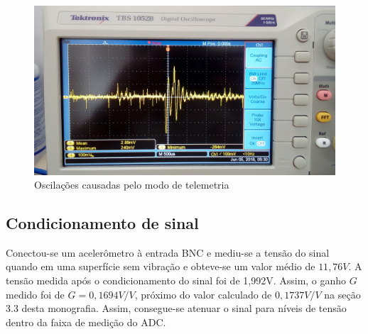 \documentclass[
	12pt,				%
	openright,			%
	twoside,			%
	a4paper,			%
	english,			%
	french,				%
	spanish,			%
	brazil,				%
	]{abntex2}
\begin{document}
			\begin{figure}[!ht]
				\centering
				\includegraphics[width = \linewidth]{../Fotos/osc33.jpg}
				\caption{Oscilações causadas pelo modo de telemetria}
				\label{fig:oscNrf}
			\end{figure}

		\subsection{Condicionamento de sinal}
			Conectou-se um acelerômetro à entrada BNC e mediu-se a
			tensão do sinal quando em uma superfície sem vibração e
			obteve-se um valor médio de $11,76V$. A tensão medida após o
			condicionamento do sinal foi de 1,992V. Assim, o ganho $G$
			medido foi de $G = 0,1694V/V$, próximo do valor calculado de $0,1737V/V$ na seção 3.3 desta monografia. Assim, consegue-se atenuar o sinal para níveis de tensão dentro da faixa de medição do ADC.
\end{document}
